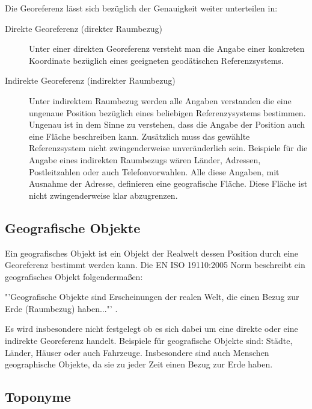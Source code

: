			Die Georeferenz lässt sich bezüglich der Genauigkeit weiter unterteilen in: 
		
			\begin{description}

	 			\item[Direkte Georeferenz (direkter Raumbezug)] 
	 				
	 				Unter einer direkten Georeferenz versteht man die Angabe einer konkreten Koordinate bezüglich eines geeigneten geodätischen Referenzsystems.  

	 			\item[Indirekte Georeferenz (indirekter Raumbezug) ] 
	 				
	 				Unter indirektem Raumbezug werden alle Angaben verstanden die eine ungenaue Position bezüglich eines beliebigen Referenzysystems bestimmen.
		 			Ungenau ist in dem Sinne zu verstehen, dass die Angabe der Position auch eine Fläche beschreiben kann.
		 			Zusätzlich muss das gewählte Referenzsystem nicht zwingenderweise unveränderlich sein.   
		 			Beispiele für die Angabe eines indirekten Raumbezugs wären Länder, Adressen, Postleitzahlen oder auch Telefonvorwahlen. 
		 			Alle diese Angaben, mit Ausnahme der Adresse, definieren eine geografische Fläche. 
		 			Diese Fläche ist nicht zwingenderweise klar abzugrenzen.  

			\end{description}

		\subsection{Geografische Objekte}
			
			Ein geografisches Objekt ist ein Objekt der Realwelt dessen Position durch eine Georeferenz bestimmt werden kann. 
			Die EN ISO 19110:2005 Norm beschreibt ein geografisches Objekt folgendermaßen: 

			"'Geografische Objekte sind Erscheinungen der realen Welt, die einen Bezug zur Erde (Raumbezug) haben..."' \cite{ISO19110:2005}.

			Es wird insbesondere nicht festgelegt ob es sich dabei um eine direkte oder eine indirekte Georeferenz handelt.
			Beispiele für geografische Objekte sind: Städte, Länder, Häuser oder auch Fahrzeuge.
			Insbesondere sind auch Menschen geographische Objekte, da sie zu jeder Zeit einen Bezug zur Erde haben.

		\subsection{Toponyme}  
			
